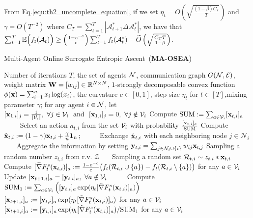 	\begin{remark}\label{Remark:final1}
		From Eq.\eqref{equ:th2_uncomplete_equation}, if we set $\eta_{t}=O\left(\sqrt{\frac{(1-\beta)C_{T}}{T}}\right)$ and $\gamma=O(T^{-2})$ where $C_{T}=\sum_{t=1}^{T}|\mathcal{A}_{t+1}^{*}\Delta\mathcal{A}_{t}^{*}|$, we have that $\sum_{t=1}^{T}\mathbb{E}\Big(f_{t}(\mathcal{A}_{t})\Big)\ge\Big(\frac{1-e^{-c}}{c}\Big)\sum_{t=1}^{T}f_{t}(\mathcal{A}_{t}^{*})-\widetilde{O}\left(\sqrt{\frac{C_{T}T}{1-\beta}}\right)$.
	\end{remark}
			\begin{algorithm}[t]
			\caption{Multi-Agent Online Surrogate Entropic Ascent~(\textbf{MA-OSEA})}\label{alg:BDOEA}
			\begin{algorithmic}[1]
				 Number of iterations $T$, the set of agents $\mathcal{N}$, communication graph $G(\mathcal{N},\mathcal{E})$,
				weight matrix $\mathbf{W}=[w_{ij}]\in\mathbb{R}^{N\times N}$, $1$-strongly decomposable convex function $\phi(\mathbf{x})=\sum_{i=1}^{n}x_{i}\log(x_{i})$, the curvature $c\in[0,1]$, step size $\eta_{t}$ for $t\in[T]$,mixing parameter $\gamma$;
				 for any agent $i\in\mathcal{N}$, let $[\mathbf{x}_{1,i}]_{j}=\frac{1}{|\mathcal{V}_{i}|},\ \forall j\in\mathcal{V}_{i}\ \text{ and }\  [\mathbf{x}_{1,i}]_{j}=0,\ \forall j\notin\mathcal{V}_{i}$
				\STATE Compute $\text{SUM}:=\sum_{a\in\mathcal{V}_{i}}[\mathbf{x}_{t,i}]_{a}$\ \ \ \  
				\STATE Select an action $a_{t,i}$ from the set $\mathcal{V}_{i}$ with probability $\frac{[\mathbf{x}_{t,i}]_{a}}{\text{SUM}}$
				\STATE Compute $\hat{\mathbf{x}}_{t, i}:=(1-\gamma)\mathbf{x}_{t, i}+\frac{\gamma}{n}\mathbf{1}_{n}$;\ \ \ \ \  
				\STATE Exchange $\hat{\mathbf{x}}_{t,i}$ with each neighboring node $j\in\mathcal{N}_{i}$\ \ \ 
				\STATE Aggregate the information by setting $ \mathbf{y}_{t,i}=\sum_{j\in\mathcal{N}_{i}\cup\{i\}}w_{ij}\mathbf{x}_{t,j}$%
				\STATE Sampling a random number $z_{t,i}$ from r.v. $\mathcal{Z}$\ \ \ 
				\STATE Sampling a random set $\mathcal{R}_{t,i}\sim z_{t,i}*\mathbf{x}_{t,i}$
				\STATE Compute $[\widetilde{\nabla} F_{t}^{s}(\mathbf{x}_{t,i})]_{a}:=\frac{1-e^{-c}}{c} \big(f_{t}(\mathcal{R}_{t,i}\cup\{a\})-f_{t}(\mathcal{R}_{t,i}\setminus\{a\})\big)$ for any $a\in\mathcal{V}_{i}$ 
				\STATE Update $	[\mathbf{x}_{t+1,i}]_{a}=[\mathbf{y}_{t,i}]_{a},\ \forall a\notin\mathcal{V}_{i}$\ \ \ \ \ 
				\STATE Compute $\text{SUM}_{1}:=\sum_{a\in\mathcal{V}_{i}}\Big(	[\mathbf{y}_{t,i}]_{a}\exp(\eta_{t}[\tilde{\nabla} F_{t}^{s}(\mathbf{x}_{t,i})]_{a})\Big)$
				\STATE  $[\mathbf{x}_{t+1,i}]_{a}:=[\mathbf{y}_{t,i}]_{a}\exp(\eta_{t}[\tilde{\nabla} F_{t}^{s}(\mathbf{x}_{t,i})]_{a})$ for any $a\in\mathcal{V}_{i}$
				\ELSE \STATE $[\mathbf{x}_{t+1,i}]_{a}:=[\mathbf{y}_{t,i}]_{a}\exp(\eta_{t}[\tilde{\nabla} F_{t}^{s}(\mathbf{x}_{t,i})]_{a})/\text{SUM}_{1}$ for any $a\in\mathcal{V}_{i}$
				\ENDIF
				\ENDFOR
				\ENDFOR
			\end{algorithmic}
		\end{algorithm}